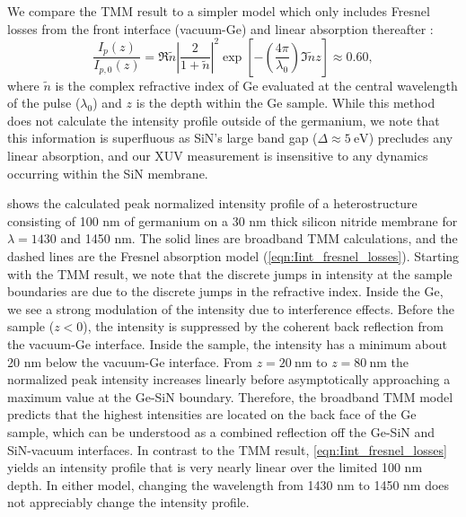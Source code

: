 We compare the TMM result to a simpler model which only includes Fresnel losses from the front interface (vacuum-Ge) and linear absorption thereafter \cite{zurchDirectSimultaneousObservation2017}:
\begin{equation}
\frac{I_p(z)}{I_{p,0}(z)} = \Re{\tilde{n}} \left| \frac{2}{1+\tilde{n}} \right|^2 \exp \left[ - \left( \frac{4 \pi}{\lambda_0} \right) \Im{\tilde{n}} z \right] \approx 0.60,
\label{eqn:Iint_fresnel_losses}
\end{equation}
where $\tilde{n}$ is the complex refractive index of Ge evaluated at the central wavelength of the pulse ($\lambda_0$) and $z$ is the depth within the Ge sample. While this method does not calculate the intensity profile outside of the germanium, we note that this information is superfluous as SiN's large band gap ($\Delta \approx 5 \ \textrm{eV}$) precludes any linear absorption, and our XUV measurement is insensitive to any dynamics occurring within the SiN membrane.

 shows the calculated peak normalized intensity profile of a heterostructure consisting of 100 nm of germanium on a 30 nm thick silicon nitride membrane for ${\lambda = 1430}$ and 1450 nm. The solid lines are broadband TMM calculations, and the dashed lines are the Fresnel absorption model (\cref{eqn:Iint_fresnel_losses}). Starting with the TMM result, we note that the discrete jumps in intensity at the sample boundaries are due to the discrete jumps in the refractive index. Inside the Ge, we see a strong modulation of the intensity due to interference effects. Before the sample ($z < 0$), the intensity is suppressed by the coherent back reflection from the vacuum-Ge interface. Inside the sample, the intensity has a minimum about 20 nm below the vacuum-Ge interface. From $z=20 \ \textrm{nm}$ to $z=80 \ \textrm{nm}$ the normalized peak intensity increases linearly before asymptotically approaching a maximum value at the Ge-SiN boundary. Therefore, the broadband TMM model predicts that the highest intensities are located on the back face of the Ge sample, which can be understood as a combined reflection off the Ge-SiN and SiN-vacuum interfaces. In contrast to the TMM result, \cref{eqn:Iint_fresnel_losses} yields an intensity profile that is very nearly linear over the limited 100 nm depth. In either model, changing the wavelength from 1430 nm to 1450 nm does not appreciably change the intensity profile.

